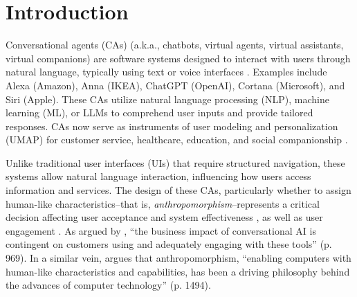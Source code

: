 \documentclass[manuscript,anonymous,sigconf]{acmart}
\begin{document}

\maketitle

\section{Introduction}
\label{sec:introduction}

Conversational agents (CAs) (a.k.a., chatbots, virtual agents, virtual assistants, virtual companions) are software systems designed to interact with users through natural language, typically using text or voice interfaces \citep{diederich_conversational_2019}. Examples include Alexa (Amazon), Anna (IKEA), ChatGPT (OpenAI), Cortana (Microsoft), and Siri (Apple). These CAs utilize natural language processing (NLP), machine learning (ML), or LLMs to comprehend user inputs and provide tailored responses. CAs now serve as instruments of user modeling and personalization (UMAP) for customer service, healthcare, education, and social companionship \citep{araujo2018living,brandtzaeg2017people}. 

Unlike traditional user interfaces (UIs) that require structured navigation, these systems allow natural language interaction, influencing how users access information and services. The design of these CAs, particularly whether to assign human-like characteristics--that is, \textit{anthropomorphism}--represents a critical decision affecting user acceptance and system effectiveness \citep{pfeuffer2019anthropomorphic,ashfaq2020deploying}, as well as user engagement \citep{gong_how_2008}. As argued by \citet{chandra_be_2022}, ``the business impact of conversational AI is contingent on customers using and adequately engaging with these tools'' (p. 969). In a similar vein, \citet{gong_how_2008} argues that anthropomorphism, ``enabling computers with human-like characteristics and capabilities, has been a driving philosophy behind the advances of computer technology'' (p. 1494). 

\end{document}

